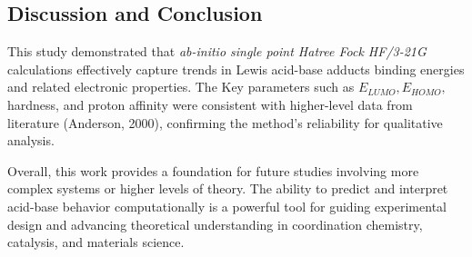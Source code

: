 \subsection{Discussion and Conclusion}
This study demonstrated that \textit{ab-initio single point Hatree Fock HF/3-21G} calculations effectively capture trends in Lewis acid-base adducts binding energies and related electronic properties. The Key parameters such as $E_{LUMO}, E_{HOMO} ,$ hardness, and proton affinity were consistent with higher-level data from literature (Anderson, 2000), confirming the method’s reliability for qualitative analysis.

Overall, this work provides a foundation for future studies involving more complex systems or higher levels of theory. The ability to predict and interpret acid-base behavior computationally is a powerful tool for guiding experimental design and advancing theoretical understanding in coordination chemistry, catalysis, and materials science.\\


\noindent\dotfill

\newpage
